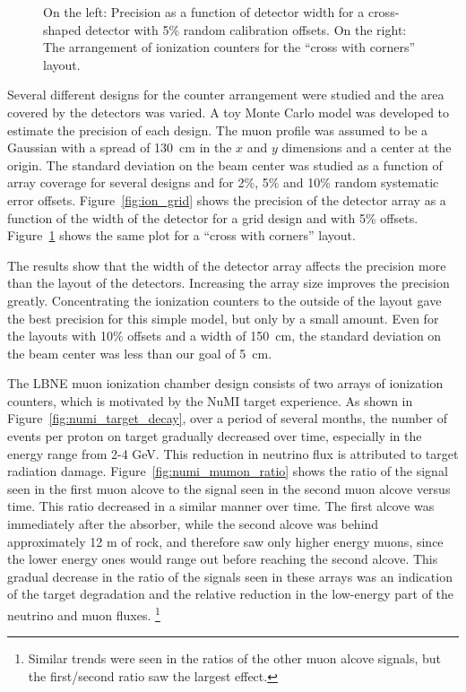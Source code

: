 \begin{figure}[htb]
\centering
\caption[Ion chamber performance for cross-with-corners layout]
{On the left: Precision as a function of detector width for a cross-shaped detector 
with 5\% random calibration offsets. On the right: The 
arrangement of ionization counters for the ``cross with corners'' layout.}
\label{fig:cross_grid}
\end{figure}

Several different designs for the counter arrangement were studied and the
area covered by the detectors was varied. A toy Monte Carlo model was
developed to estimate the precision of each design. The muon profile
was assumed to be a Gaussian with a spread of 130~cm in the $x$ and $y$
dimensions and a center at the origin. 
The standard deviation on the beam center was studied as a
function of array coverage for several designs and for 2\%, 5\% and
10\% random systematic error offsets. Figure~\ref{fig:ion_grid} shows the
precision of the detector array as a function of the width of the
detector for a grid design and with 5\%
offsets. Figure~\ref{fig:cross_grid} shows the same plot for a
``cross with corners'' layout.



The results show that the width of the detector array affects the
precision more than the layout of the detectors. Increasing the array
size improves the precision greatly. Concentrating the ionization
counters to the outside of the layout gave the best precision for this
simple model, but only by a small amount. Even for the layouts with
10\% offsets and a width of 150~cm, the standard deviation on the beam
center was less than our goal of 5~cm.

The LBNE muon ionization chamber design consists of two arrays of 
ionization counters, which is motivated by the NuMI target experience.  As shown in Figure~\ref{fig:numi_target_decay}, over a period of several months, the number of events per proton on target gradually decreased over time, especially in the energy range from 2-4 GeV.  
This reduction in neutrino flux is attributed to 
target radiation damage.  Figure~\ref{fig:numi_mumon_ratio} shows the ratio of the signal seen  in the first muon alcove to the signal seen in the second muon alcove versus time.  This ratio decreased in a similar manner over time.  
The first alcove was immediately after the absorber, while the second alcove was behind approximately 12 m of rock, and therefore saw only higher energy muons, since the lower energy ones would range out before reaching the second alcove.  
This gradual decrease in the ratio of the signals seen in these arrays was an indication of the target degradation and the relative reduction in the 
low-energy part of the neutrino and muon fluxes.  \footnote{Similar trends were seen in the ratios of the other muon alcove signals, but the first/second ratio saw the largest effect.}

